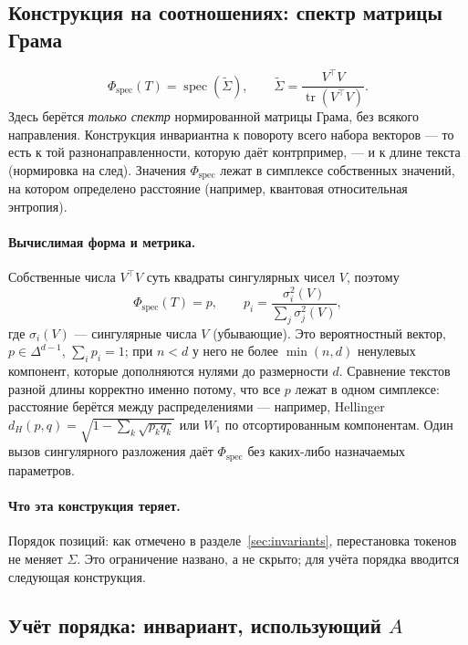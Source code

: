 \documentclass[11pt,a4paper]{article}
\theoremstyle{definition}
\theoremstyle{plain}
\DeclareMathOperator{\tr}{tr}
\DeclareMathOperator{\spec}{spec}
\begin{document}
\subsection{Конструкция на соотношениях: спектр матрицы Грама}

\begin{equation}
\Phi_{\mathrm{spec}}(T)=\spec(\tilde\Sigma),
\qquad \tilde\Sigma=\frac{V^\top V}{\tr(V^\top V)} .
\end{equation}
Здесь берётся \emph{только спектр} нормированной матрицы Грама, без всякого направления.
Конструкция инвариантна к повороту всего набора векторов — то есть к той разнонаправленности,
которую даёт контрпример, — и к длине текста (нормировка на след). Значения
$\Phi_{\mathrm{spec}}$ лежат в симплексе собственных значений, на котором определено расстояние
(например, квантовая относительная энтропия).

\paragraph{Вычислимая форма и метрика.} Собственные числа $V^\top V$ суть квадраты сингулярных
чисел $V$, поэтому
\[
\Phi_{\mathrm{spec}}(T)=p,\qquad p_i=\frac{\sigma_i^2(V)}{\sum_{j}\sigma_j^2(V)},
\]
где $\sigma_i(V)$ — сингулярные числа $V$ (убывающие). Это вероятностный вектор,
$p\in\Delta^{d-1}$, $\sum_i p_i=1$; при $n<d$ у него не более $\min(n,d)$ ненулевых компонент,
которые дополняются нулями до размерности $d$. Сравнение текстов разной длины корректно именно
потому, что все $p$ лежат в одном симплексе: расстояние берётся между распределениями —
например, Hellinger $d_H(p,q)=\sqrt{1-\sum_k\sqrt{p_kq_k}}$ или $W_1$ по отсортированным
компонентам. Один вызов сингулярного разложения даёт $\Phi_{\mathrm{spec}}$ без каких-либо
назначаемых параметров.

\paragraph{Что эта конструкция теряет.} Порядок позиций: как отмечено в
разделе~\ref{sec:invariants}, перестановка токенов не меняет $\Sigma$. Это ограничение
названо, а не скрыто; для учёта порядка вводится следующая конструкция.

\subsection{Учёт порядка: инвариант, использующий $A$}
\end{document}
